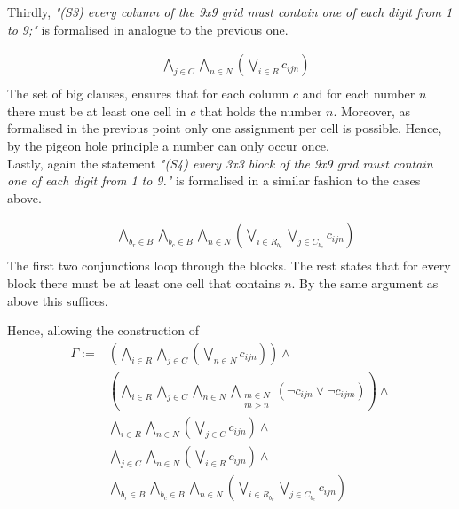\documentclass[11pt,a4paper]{article}
\begin{document}
Thirdly, \emph{"(S3) every column of the 9x9 grid must contain one of each digit from 1 to 9;"} is formalised in analogue to the previous one.

\begin{equation*}
\begin{split}
&\bigwedge_{j \in C}  \bigwedge_{n \in N} (\bigvee_{i \in R} c_{ijn}) \\
\end{split}
\end{equation*}
The set of big clauses, ensures that for each column $c$ and for each number $n$ there must be at least one cell in $c$ that holds the number $n$. Moreover, as formalised in the previous point only one assignment per cell is possible. Hence, by the pigeon hole principle a number can only occur once.\\

Lastly, again the statement \emph{"(S4) every 3x3 block of the 9x9 grid must contain one of each digit from 1 to 9."} is formalised in a similar fashion to the cases above.

\begin{equation*}
\begin{split}
&\bigwedge_{b_r \in B} \bigwedge_{b_c \in B} \bigwedge_{n \in N} (\bigvee_{i \in R_{b_r}} \bigvee_{j \in C_{b_c}} c_{ijn}) \\
\end{split}
\end{equation*}
The first two conjunctions loop through the blocks. The rest states that for every block there must be at least one cell that contains $n$.
By the same argument as above this suffices.

Hence, allowing the construction of 
\begin{equation*}
\begin{split}
\Gamma:=&
(\bigwedge_{i \in R}  \bigwedge_{j \in C} (\bigvee_{n \in N} c_{ijn}))  \land \\
&(\bigwedge_{i \in R}  \bigwedge_{j \in C} \bigwedge_{n \in N} \bigwedge_{\substack{m \in N \\ m>n}}(\neg c_{ijn} \lor \neg c_{ijm})) \land \\
&\bigwedge_{i \in R}  \bigwedge_{n \in N} (\bigvee_{j \in C} c_{ijn}) \land \\
&\bigwedge_{j \in C}  \bigwedge_{n \in N} (\bigvee_{i \in R} c_{ijn}) \land \\
&\bigwedge_{b_r \in B} \bigwedge_{b_c \in B} \bigwedge_{n \in N} (\bigvee_{i \in R_{b_r}} \bigvee_{j \in C_{b_c}} c_{ijn}) \\
\end{split}
\end{equation*}
\end{document}
